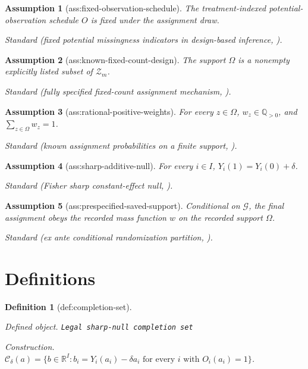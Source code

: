 \documentclass{article}
\newtheorem{assumption}{Assumption}
\newtheorem{definition}{Definition}
\begin{document}
\begin{assumption}[ass:fixed-observation-schedule]\label{ass:fixed-observation-schedule}
The treatment-indexed potential-observation schedule \(O\) is fixed under the assignment draw.
\par\smallskip\noindent\emph{Standard} (fixed potential missingness indicators in design-based inference, \cite{LiShengYu2025}).
\end{assumption}

\begin{assumption}[ass:known-fixed-count-design]\label{ass:known-fixed-count-design}
The support \(\Omega\) is a nonempty explicitly listed subset of \(\mathcal Z_m\).
\par\smallskip\noindent\emph{Standard} (fully specified fixed-count assignment mechanism, \cite{LuoDasguptaXieLiu2021}).
\end{assumption}

\begin{assumption}[ass:rational-positive-weights]\label{ass:rational-positive-weights}
For every \(z\in\Omega\), \(w_z\in\mathbb Q_{>0}\), and \(\sum_{z\in\Omega}w_z=1\).
\par\smallskip\noindent\emph{Standard} (known assignment probabilities on a finite support, \cite{LuoDasguptaXieLiu2021}).
\end{assumption}

\begin{assumption}[ass:sharp-additive-null]\label{ass:sharp-additive-null}
For every \(i\in I\), \(Y_i(1)=Y_i(0)+\delta\).
\par\smallskip\noindent\emph{Standard} (Fisher sharp constant-effect null, \cite{Fisher1935}).
\end{assumption}

\begin{assumption}[ass:prespecified-saved-support]\label{ass:prespecified-saved-support}
Conditional on \(\mathscr G\), the final assignment obeys the recorded mass function \(w\) on the recorded support \(\Omega\).
\par\smallskip\noindent\emph{Standard} (ex ante conditional randomization partition, \cite{HennessyEtAl2016}).
\end{assumption}

\section{Definitions}

\begin{definition}[def:completion-set]\label{def:completion-set}
\par\smallskip\noindent\emph{Defined object.} \texttt{Legal sharp-\allowbreak{}null completion set}
\par\smallskip\noindent\emph{Construction.} \(\mathcal C_\delta(a)=\{b\in\mathbb R^I:b_i=Y_i(a_i)-\delta a_i\text{ for every }i\text{ with }O_i(a_i)=1\}\).
\end{definition}
\end{document}
